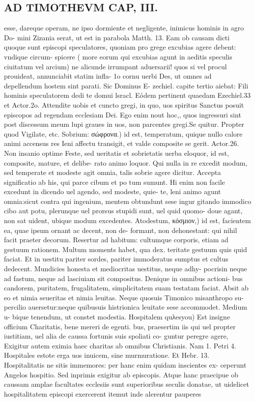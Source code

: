 \documentclass{article}
\begin{document}
\begin{pages}
\section*{AD TIMOTHEVM CAP, III. }
\marginpar{[ p.77 ]}\pstart esse, dareque operam, ne ipso dormiente et negligente, inimicus hominis in agro Do- mini Zizania serat, ut est in parabola Matth. 13. Eam ob causam dicti quoque sunt episcopi speculatores, quoniam pro grege excubias agere debent: vndique circum- spicere ( more eorum qui excubias agunt in aeditis speculis ciuitatum vel arcium) ne alicunde irrumpant aduersarii! quos si vel procul prouideat, annunciabit statim infla- 1o cornu uerbi Des, ut omnes ad depellendum hostem sint parati. Sic Dominus E- zechiel. capite tertio aiebat: Fili hominis speculatorem dedi te domui lsracl. Eódem pertinent quaedam Ezechiel.33 et Actor.2o. Attendite uobis et cuncto gregi, in quo, uos spiritus Sanctus posuit episcopos ad regendam ecclesiam Dei. Ego enim nout hoc,, quos ingressuri sint post discessum meum lupi graues in uos, non parcentes gregi.Se quitur. Propter quod Vigilate, etc.  \pend\pstart Sobrium: σώφρονα.) id est, temperatum, quique nullo calore animi accensus res Ieni affectu transigit, et valde composite se gerit. Actor.26. Non insanio optime Feste, sed ueritatis et sobrietatis uerba eloquor, id est, composite, mature, et delibe- rato animo loquor. Qui nulla in re excedit modum, sed temperate et modeste agit omnia, talis sobrie agere dicitur. Accepta significatio ab his, qui parce cibum et po tum sumunt. Hi enim non facile excedunt in dicendo uel agendo, sed modeste, quie- te, leni animo agunt omnia:sicut contra qui ingenium, mentem obtundunt sese ingur gitando immodico cibo aut potu, plerunque uel prorsus stupidi sunt, uel quid quomo- doue agant, non sat uident, ubique modum excedentes.  \pend\pstart Atodestum, κόσμιον,) id est, facientem ea, quae ipsum ornant ac decent, non de- formant, non dehonestant: qui nihil facit praeter decorum. Resertur ad habitum: cultumque corporis, etiam ad gestuum rationem. Multum moments habet, qua dex. teritate gestuum quis quid faciat. Et in uestitu pariter sordes, pariter immoderatus sumptus et cultus dedecent. Mundicies honesta et mediocritas uestitus, neque adhy- pocrisin neque ad fastum, neque ad lasciuiam sit compositus. Denique in omnibus actioni- bus candorem, puritatem, frugalitatem, simplicitatem suam testatam faciat. Absit ab eo et nimia seueritas et nimia leuitas. Neque quosuis Timonico misanthropo su- percilio auersetur:neque quibusuis histrionica leuitate sese accommodet. Medium u- bique tenendum, ut constet modestia.  \pend\pstart Hospitalem quλesyou) Est insigne officium Charitatis, bene mereri de egenti. bus, praesertim iis qui uel propter iustitiam, uel alia de caussa fortunis suis spoliati co- guntur peregre agere, Exigitur autem eximia haec charitas ab omnibus Christianis. Nam 1. Petri 4. Hospitales estote erga uos inuicem, sine murmuratione. Et Hebr. 13. Hospitalitatis ne sitis immemores: per hanc enim quidam inscientes ex- ceperunt Angelos hospitio. Sed inprimis exigitur ab episcopis. Atque hanc praecipue ob caussam amplae facultates ecclesiis sunt superioribus seculis donatae, ut uidelicet hospitalitatem episcopi exercerent itemut inde alerentur pauperes 
\end{pages}
\end{document}
